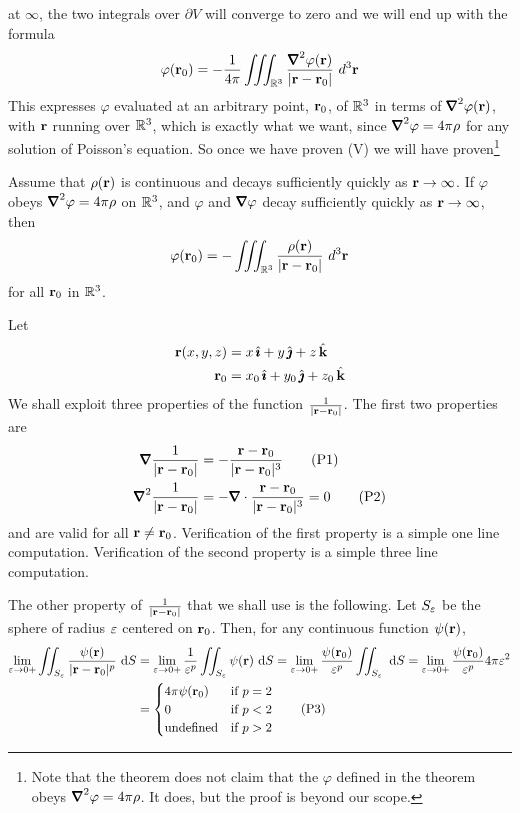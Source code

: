 at $\infty$, the two integrals over $\partial V$ will converge to zero and
we will end up with the formula 
\begin{equation*}
\varphi(\vr_0)=-\frac{1}{4\pi}
\tripInt_{\bbbr^3}\frac{ \vnabla^2\varphi(\vr)}{|\vr-\vr_0|}\ d^3\vr
\end{equation*}
This expresses $\varphi$ evaluated at an
arbitrary point, $\mathbf{r}_0$, of $\mathbb{R}^3$ in terms of $\vnabla^2\varphi(\vr)$, 
with $\mathbf{r}$ running over $\mathbb{R}^3$, which is exactly what we want, since
$\vnabla^2\varphi = 4\pi\rho$ for any solution of Poisson's equation.
So once we have proven (V) we will have proven\footnote{Note that the theorem
does not claim that the $\varphi$ defined in the theorem obeys
$\vnabla^2\varphi = 4\pi\rho$. It does, but the proof is beyond our scope.}
\begin{theorem}\label{thm:PoissonSoln}
Assume that $\rho(\mathbf{r})$ is continuous and decays sufficiently quickly as
$\mathbf{r}\rightarrow\infty$.  If $\varphi$ obeys
$\vnabla^2\varphi = 4\pi\rho$ on $\mathbb{R}^3$, and $\varphi$ 
and $\vnabla\varphi$ decay sufficiently quickly as $\mathbf{r}\rightarrow\infty$, then
\begin{equation*}
\varphi(\mathbf{r}_0)=
-\iiint_{\mathbb{R}^3}\frac{ \rho(\mathbf{r})}{|\mathbf{r}-\mathbf{r}_0|}\ d^3\mathbf{r}
\end{equation*}
for all $\mathbf{r}_0$ in $\mathbb{R}^3$.
\end{theorem}

Let 
\begin{align*}
\mathbf{r}(x,y,z)&=x\,\hat{\pmb{\imath}}+y\,\hat{\pmb{\jmath}}+z\,\hat{\mathbf{k}}\\
\mathbf{r}_0&=x_0\,\hat{\pmb{\imath}}+y_0\,\hat{\pmb{\jmath}}+z_0\,\hat{\mathbf{k}}
\end{align*}
We shall exploit three properties of the function
$\frac{1}{|\mathbf{r}-\mathbf{r}_0|}$. The first two properties are
\begin{align}
\vnabla \frac{1}{|\vr-\vr_0|} &=-\frac{\vr-\vr_0}{|\vr-\vr_0|^3}\tag{P1}\\
\vnabla^2 \frac{1}{|\vr-\vr_0|} &=-\vnabla\cdot\frac{\vr-\vr_0}{|\vr-\vr_0|^3}
=0
\tag{P2}\end{align}
and are valid for all $\mathbf{r}\ne \mathbf{r}_0$. Verification of the first property is
a simple one line computation. Verification of the second property is
a simple three line computation. 

The other property of $\frac{1}{|\mathbf{r}-\mathbf{r}_0|}$ 
that we shall use is the following. Let $S_\varepsilon$ be the sphere of 
radius $\varepsilon$ centered on $\mathbf{r}_0$. Then, for any continuous function $\psi(\mathbf{r})$,
\begin{align}
\lim_{\varepsilon\rightarrow 0+}\iint_{S_\varepsilon}
              \frac{\psi(\mathbf{r})}{|\mathbf{r}-\mathbf{r}_0|^p}\ \mathrm{d}S
&=\lim_{\varepsilon\rightarrow 0+} \frac{1}{\varepsilon^p} \iint_{S_\varepsilon}
              \psi(\mathbf{r})\ \mathrm{d}S
=\lim_{\varepsilon\rightarrow 0+}\frac{\psi(\mathbf{r}_0)}{\varepsilon^p}
             \iint_{S_\varepsilon}\ \mathrm{d}S
=\lim_{\varepsilon\rightarrow 0+}\frac{\psi(\mathbf{r}_0)}{\varepsilon^p}4\pi\varepsilon^2
\notag\\
&=\begin{cases}4\pi\psi(\mathbf{r}_0)& \text{if $p=2$}\\
         0             & \text{if $p<2$}\\
         \text{undefined} & \text{if $p>2$}
         \end{cases}
\tag{P3}
\end{align}


